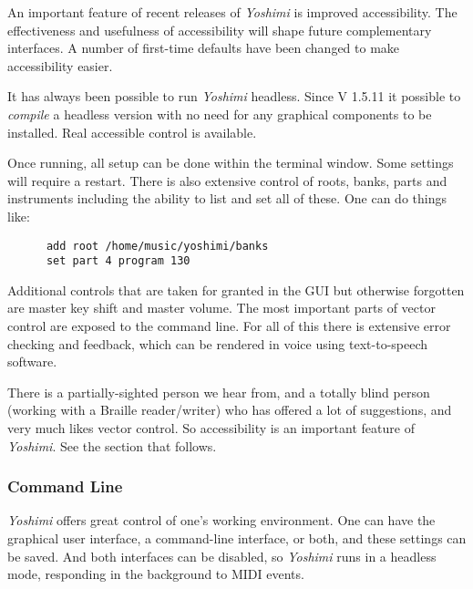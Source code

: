 \documentclass[
 11pt,
 twoside,
 a4paper,
 final                                 %
]{article}
\begin{document}
   An important feature of recent releases of \textsl{Yoshimi} is improved
   accessibility. The effectiveness and usefulness of accessibility will
   shape future complementary interfaces. A number of first-time defaults
   have been changed to make accessibility easier.

   It has always been possible to run \textsl{Yoshimi} headless. Since V 1.5.11
   it possible to \textsl{compile} a headless version with no need for
   any graphical components to be installed.
   Real accessible control is available.


   Once running, all setup can be done within the terminal window.
   Some settings will require a restart.
   There is also extensive control of
   roots, banks, parts and instruments including the ability to list and set
   all of these. One can do things like:

   \begin{verbatim}
      add root /home/music/yoshimi/banks
      set part 4 program 130
   \end{verbatim}

   Additional controls that are taken for granted in the GUI but
   otherwise forgotten are master key shift and master volume.  The
   most important parts of vector control are exposed to the command line.
   For all of this there is extensive error checking and feedback, which can be
   rendered in voice using text-to-speech software.

   There is a partially-sighted person we hear from, and
   a totally blind person (working with a Braille reader/writer) who has
   offered a lot of suggestions, and very much likes vector control.  So
   accessibility  is an important feature of
   \textsl{Yoshimi}.  See the section that follows.

\subsubsection{Command Line}
\label{subsubsec:new_features_command_line}

   \textsl{Yoshimi} offers great control of one's working environment.
   One can have the graphical user interface, a command-line
   interface, or both, and these settings can be saved.  And both
   interfaces can be disabled, so \textsl{Yoshimi} runs in a headless
   mode, responding in the background to MIDI events.
\end{document}
